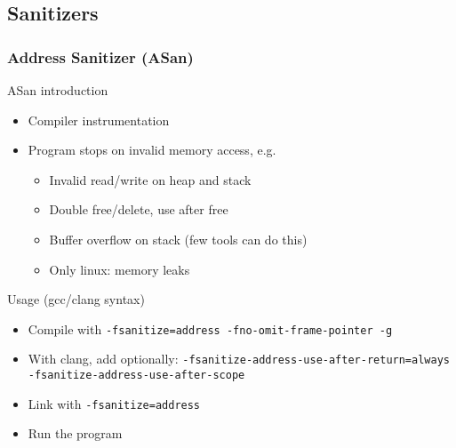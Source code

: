 \subsection[sani]{Sanitizers}

\begin{frame}[fragile]
  \frametitle{Address Sanitizer (ASan)}
  \begin{block}{ASan introduction}
    \begin{itemize}
    \item Compiler instrumentation
    \item Program stops on invalid memory access, e.g.\
      \begin{itemize}
        \item Invalid read/write on heap and stack
        \item Double free/delete, use after free
        \item Buffer overflow on stack (few tools can do this)
        \item Only linux: memory leaks
      \end{itemize}
    \end{itemize}
  \end{block}
  \pause
  \begin{exampleblock}{Usage (gcc/clang syntax)}
    \begin{itemize}
    \item Compile with \texttt{-fsanitize=address -fno-omit-frame-pointer -g}
    \item With clang, add optionally: \texttt{-fsanitize-address-use-after-return=always -fsanitize-address-use-after-scope}
    \item Link with \texttt{-fsanitize=address}
    \item Run the program
    \end{itemize}
  \end{exampleblock}
\end{frame}

